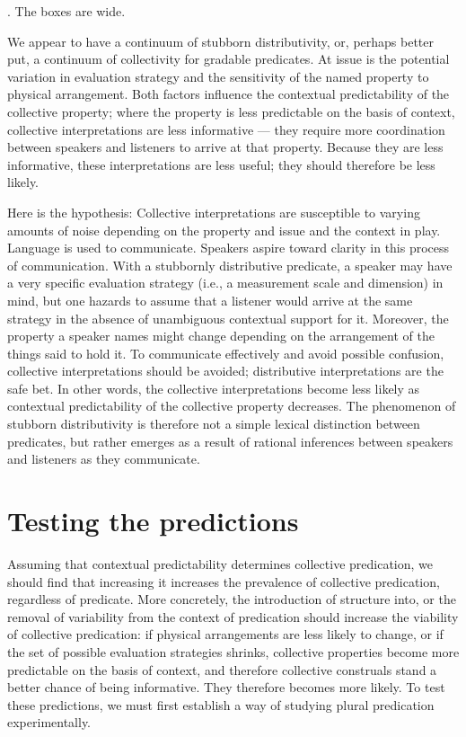 \documentclass[linguex]{sp}
\begin{document}
\ex. The boxes are wide.

We appear to have a continuum of stubborn distributivity, or, perhaps better put, a continuum of collectivity for gradable predicates. At issue is the potential variation in evaluation strategy and the sensitivity of the named property to physical arrangement. Both factors influence the contextual predictability of the collective property; where the property is less predictable on the basis of context, collective interpretations are less informative --- they require more coordination between speakers and listeners to arrive at that property. Because they are less informative, these interpretations are less useful; they should therefore be less likely.

Here is the hypothesis: Collective interpretations are susceptible to varying amounts of noise depending on the property and issue and the context in play. Language is used to communicate. Speakers aspire toward clarity in this process of communication. With a stubbornly distributive predicate, a speaker may have a very specific evaluation strategy (i.e., a measurement scale and dimension) in mind, but one hazards to assume that a listener would arrive at the same strategy in the absence of unambiguous contextual support for it. Moreover, the property a speaker names might change depending on the arrangement of the things said to hold it. To communicate effectively and avoid possible confusion, collective interpretations should be avoided; distributive interpretations are the safe bet. In other words, the collective interpretations become less likely as contextual predictability of the collective property decreases. The phenomenon of stubborn distributivity is therefore not a simple lexical distinction between predicates, but rather emerges as a result of rational inferences between speakers and listeners as they communicate.

\section{Testing the predictions}

Assuming that contextual predictability determines collective predication, we should find that increasing it increases the prevalence of collective predication, regardless of predicate. More concretely, the introduction of structure into, or the removal of variability from the context of predication should increase the viability of collective predication: if physical arrangements are less likely to change, or if the set of possible evaluation strategies shrinks, collective properties become more predictable on the basis of context, and therefore collective construals stand a better chance of being informative. They therefore becomes more likely. To test these predictions, we must first establish a way of studying plural predication experimentally.
\end{document}
